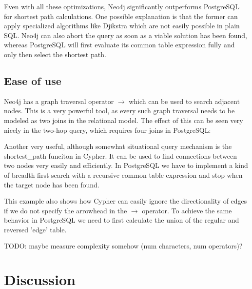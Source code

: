 \documentclass[11pt, a4paper,oneside,chapterprefix=false]{scrbook}
\begin{document}
Even with all these optimizations, Neo4j significantly outperforms PostgreSQL for shortest path calculations.
One possible explanation is that the former can apply specialized algorithms like Djikstra \cite{TODO} which are not easily possible in plain SQL.
Neo4j can also abort the query as soon as a viable solution has been found, whereas PostgreSQL will first evaluate its common table expression fully and only then select the shortest path.

\section{Ease of use} \label{sec:convenience}

Neo4j has a graph traversal operator $\rightarrow$ which can be used to search adjacent nodes.
This is a very powerful tool, as every such graph traversal needs to be modeled as two joins in the relational model.
The effect of this can be seen very nicely in the two-hop query, which requires four joins in PostgreSQL:



Another very useful, although somewhat situational query mechanism is the shortest\_path funciton in Cypher.
It can be used to find connections between two nodes very easily and efficiently.
In PostgreSQL we have to implement a kind of breadth-first search with a recursive common table expression and stop when the target node has been found.



This example also shows how Cypher can easily ignore the directionality of edges
if we do not specify the arrowhead in the $\rightarrow$ operator.
To achieve the same behavior in PostgreSQL we need to first calculate the union of the regular and reversed 'edge' table.

TODO: maybe measure complexity somehow (num characters, num operators)?

\chapter{Discussion} \label{chp:discussion}
\end{document}
